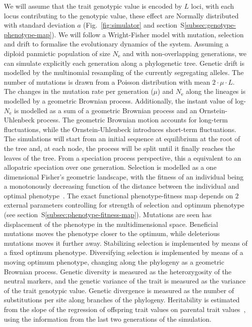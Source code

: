 \documentclass{article}
\newcommand{\Multiply}{\cdot}
\newcommand{\Ne}{N_{\text{e}}}
\newcommand{\MutationRate}{\mu}
\newcommand{\NbrLoci}{L}
\begin{document}
We will assume that the trait genotypic value is encoded by $\NbrLoci$ loci, with each locus contributing to the genotypic value, these effect are Normally distributed with standard deviation $a$ (Fig.~\ref{fig:simulator} and section~S\ref{subsec:genotype-phenotype-map}).
We will follow a Wright-Fisher model with mutation, selection and drift to formalise the evolutionary dynamics of the system.
Assuming a diploid panmictic population of size $\Ne$ and with non-overlapping generations, we can simulate explicitly each generation along a phylogenetic tree.
Genetic drift is modelled by the multinomial resampling of the currently segregating alleles.
The number of mutations is drawn from a Poisson distribution with mean $2 \Multiply \MutationRate \Multiply \NbrLoci $.
The changes in the mutation rate per generation ($\MutationRate$) and $\Ne$ along the lineages is modelled by a geometric Brownian process.
Additionally, the instant value of log-$\Ne$ is modelled as a sum of a geometric Brownian process and an Ornstein-Uhlenbeck process.
The geometric Brownian motion accounts for long-term fluctuations, while the Ornstein-Uhlenbeck introduces short-term fluctuations.
The simulations will start from an initial sequence at equilibrium at the root of the tree and, at each node, the process will be split until it finally reaches the leaves of the tree.
From a speciation process perspective, this a equivalent to an allopatric speciation over one generation.
Selection is modelled as a one dimensional Fisher's geometric landscape, with the fitness of an individual being a monotonously decreasing function of the distance between the individual and optimal phenotype~\cite{tenaillon_utility_2014,blanquart_epistasis_2016}.
The exact functional phenotype-fitness map depends on $2$ external parameters controlling for strength of selection and optimum phenotype (see section~S\ref{subsec:phenotype-fitness-map}).
Mutations are seen has displacement of the phenotype in the multidimensional space.
Beneficial mutations moves the phenotype closer to the optimum, while deleterious mutations moves it further away.
Stabilizing selection is implemented by means of a fixed optimum phenotype.
Diversifying selection is implemented by means of a moving optimum phenotype, changing along the phylogeny as a geometric Brownian process.
Genetic diversity is measured as the heterozygosity of the neutral markers, and the genetic variance of the trait is measured as the variance of the trait genotypic value.
Genetic divergence is measured as the number of substitutions per site along branches of the phylogeny.
Heritability is estimated from the slope of the regression of offspring trait values on parental trait values~\cite{lynch_genetics_1998}, using the information from the last two generations of the simulation.
\end{document}
